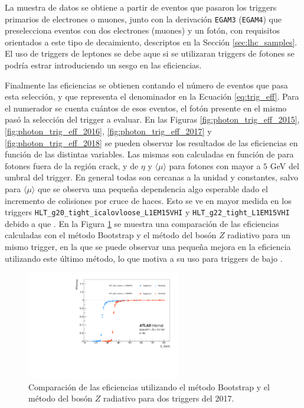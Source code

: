 La muestra de datos se obtiene a partir de eventos que pasaron los triggers primarios de electrones o muones, junto con la derivación \texttt{EGAM3} (\texttt{EGAM4}) que preselecciona eventos con dos electrones (muones) y un fotón, con requisitos orientados a este tipo de decaimiento, descriptos en la Sección \ref{sec:lhc_samples}. El uso de triggers de leptones se debe aque si se utilizaran triggers de fotones se podría estrar introduciendo un sesgo en las eficiencias.

Finalmente las eficiencias se obtienen contando el número de eventos que pasa esta selección, y que representa el denominador en la Ecuación \ref{eq:trig_eff}. Para el numerador se cuenta cuántos de esos eventos, el fotón presente en el mismo pasó la selección del trigger a evaluar. En las Figuras \ref{fig:photon_trig_eff_2015}, \ref{fig:photon_trig_eff_2016}, \ref{fig:photon_trig_eff_2017} y \ref{fig:photon_trig_eff_2018} se pueden observar los resultados de las eficiencias en función de las distintas variables. Las mismas son calculadas en función de \ET para fotones fuera de la región crack, y de $\eta$ y $\langle\mu\rangle$ para fotones con \ET mayor a $5$ GeV del umbral del trigger. En general todas son cercanas a la unidad y constantes, salvo para $\langle\mu\rangle$ que se observa una pequeña dependencia algo esperable dado el incremento de colisiones por cruce de haces. Esto se ve en mayor medida en los triggers \texttt{HLT\_g20\_tight\_icalovloose\_L1EM15VHI} y \texttt{HLT\_g22\_tight\_L1EM15VHI} debido a que . En la Figura \ref{fig:bs_vs_zrad} se muestra una comparación de las eficiencias calculadas con el método Bootstrap \cite{tesis_joaco} y el método del bosón $Z$ radiativo para un mismo trigger, en la que se puede observar una pequeña mejora en la eficiencia utilizando este último método, lo que motiva a su uso para triggers de bajo \ET.

\begin{figure}
  \centering
  \includegraphics[width=0.6\textwidth]{images/trigger/comp_eff_et_bootstrap.pdf}
	\caption{Comparación de las eficiencias utilizando el método Bootstrap y el método del bosón $Z$ radiativo para dos triggers del 2017.}
  \label{fig:bs_vs_zrad}
\end{figure}


